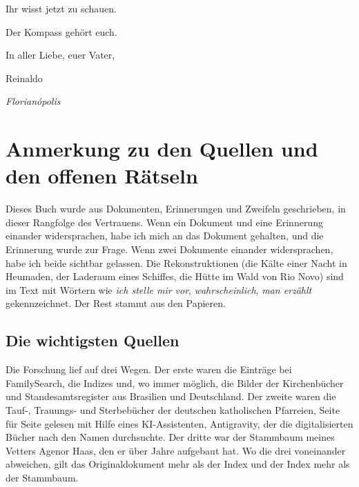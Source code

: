 \documentclass[
  ngerman,
  11pt,
  openany]{book}
\begin{document}
Ihr wisst jetzt zu schauen.

Der Kompass gehört euch.

In aller Liebe, euer Vater,

Reinaldo

\emph{Florianópolis}

\chapter*{Anmerkung zu den Quellen und den offenen
Rätseln}\label{nota-fontes}

Dieses Buch wurde aus Dokumenten, Erinnerungen und Zweifeln geschrieben,
in dieser Rangfolge des Vertrauens. Wenn ein Dokument und eine
Erinnerung einander widersprachen, habe ich mich an das Dokument
gehalten, und die Erinnerung wurde zur Frage. Wenn zwei Dokumente
einander widersprachen, habe ich beide sichtbar gelassen. Die
Rekonstruktionen (die Kälte einer Nacht in Heumaden, der Laderaum eines
Schiffes, die Hütte im Wald von Rio Novo) sind im Text mit Wörtern wie
\emph{ich stelle mir vor}, \emph{wahrscheinlich}, \emph{man erzählt}
gekennzeichnet. Der Rest stammt aus den Papieren.

\section{Die wichtigsten Quellen}\label{die-wichtigsten-quellen}

Die Forschung lief auf drei Wegen. Der erste waren die Einträge bei
FamilySearch, die Indizes und, wo immer möglich, die Bilder der
Kirchenbücher und Standesamtsregister aus Brasilien und Deutschland. Der
zweite waren die Tauf-, Trauungs- und Sterbebücher der deutschen
katholischen Pfarreien, Seite für Seite gelesen mit Hilfe eines
KI-Assistenten, Antigravity, der die digitalisierten Bücher nach den
Namen durchsuchte. Der dritte war der Stammbaum meines Vetters Agenor
Haas, den er über Jahre aufgebaut hat. Wo die drei voneinander
abweichen, gilt das Originaldokument mehr als der Index und der Index
mehr als der Stammbaum.
\end{document}
